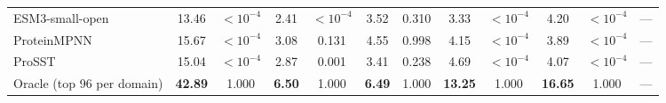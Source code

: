 \begin{table}[H]
{\begin{tabular}{lccccccccccl}
ESM3-small-open & 13.46 & $<10^{-4}$ & 2.41 & $<10^{-4}$ & 3.52 & 0.310 & 3.33 & $<10^{-4}$ & 4.20 & $<10^{-4}$ & --- \\
ProteinMPNN & 15.67 & $<10^{-4}$ & 3.08 & 0.131 & 4.55 & 0.998 & 4.15 & $<10^{-4}$ & 3.89 & $<10^{-4}$ & --- \\
ProSST & 15.04 & $<10^{-4}$ & 2.87 & 0.001 & 3.41 & 0.238 & 4.69 & $<10^{-4}$ & 4.07 & $<10^{-4}$ & --- \\
Oracle (top 96 per domain) & \textbf{42.89} & 1.000 & \textbf{6.50} & 1.000 & \textbf{6.49} & 1.000 & \textbf{13.25} & 1.000 & \textbf{16.65} & 1.000 & --- \\
\bottomrule
\end{tabular}
}
\end{table}




